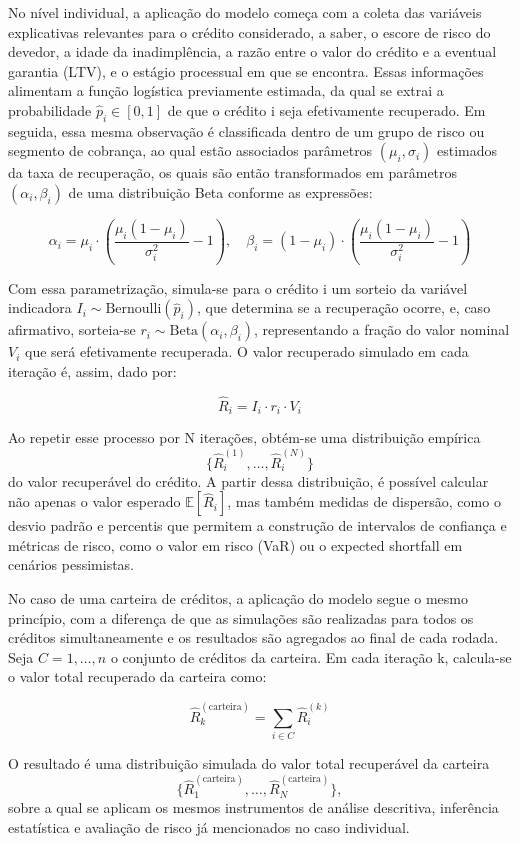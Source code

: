 \documentclass[a4paper,12pt]{article}
\begin{document}
No nível individual, a aplicação do modelo começa com a coleta das variáveis explicativas relevantes para o crédito considerado, a saber, o escore de risco do devedor, a idade da inadimplência, a razão entre o valor do crédito e a eventual garantia (LTV), e o estágio processual em que se encontra. Essas informações alimentam a função logística previamente estimada, da qual se extrai a probabilidade 
$\hat{p}_{i} \in [0,1]$ de que o crédito i seja efetivamente recuperado. Em seguida, essa mesma observação é classificada dentro de um grupo de risco ou segmento de cobrança, ao qual estão associados parâmetros 
$(\mu_i,\sigma_i)$ estimados da taxa de recuperação, os quais são então transformados em parâmetros 
$(\alpha_i,\beta_i)$ de uma distribuição Beta conforme as expressões:

\[ \alpha_i = \mu_i \cdot \left( \frac{\mu_i (1 - \mu_i)}{\sigma_i^2} - 1 \right), \quad \beta_i = (1 - \mu_i) \cdot \left( \frac{\mu_i (1 - \mu_i)}{\sigma_i^2} - 1 \right) \]

Com essa parametrização, simula-se para o crédito i um sorteio da variável indicadora $I_i \sim \text{Bernoulli}(\hat{p}_{i})$, que determina se a recuperação ocorre, e, caso afirmativo, sorteia-se 
$r_i \sim \text{Beta}(\alpha_i, \beta_i)$, representando a fração do valor nominal $V_i$ que será efetivamente recuperada. O valor recuperado simulado em cada iteração é, assim, dado por:

\[ \hat{R}_i = I_i \cdot r_i \cdot V_i \]
 
Ao repetir esse processo por N iterações, obtém-se uma distribuição empírica \[\{ \hat{R}_i^{(1)}, \dots, \hat{R}_i^{(N)} \}\] do valor recuperável do crédito. A partir dessa distribuição, é possível calcular não apenas o valor esperado 
$\mathbb{E}[\hat{R}_i]$, mas também medidas de dispersão, como o desvio padrão e percentis que permitem a construção de intervalos de confiança e métricas de risco, como o valor em risco (VaR) ou o expected shortfall em cenários pessimistas.

No caso de uma carteira de créditos, a aplicação do modelo segue o mesmo princípio, com a diferença de que as simulações são realizadas para todos os créditos simultaneamente e os resultados são agregados ao final de cada rodada. Seja 
$C={1,…,n}$ o conjunto de créditos da carteira. Em cada iteração k, calcula-se o valor total recuperado da carteira como:

\[ \hat{R}_k^{(\text{carteira})} = \sum_{i \in C} \hat{R}_i^{(k)} \]
 
O resultado é uma distribuição simulada do valor total recuperável da carteira 
\[\{ \hat{R}_1^{(\text{carteira})}, \dots, \hat{R}_N^{(\text{carteira})} \},\]
sobre a qual se aplicam os mesmos instrumentos de análise descritiva, inferência estatística e avaliação de risco já mencionados no caso individual.
\end{document}
